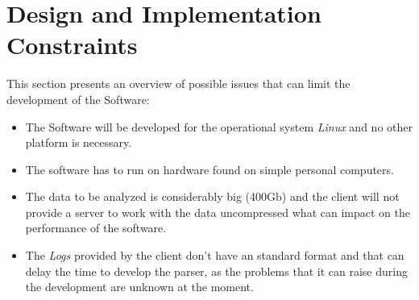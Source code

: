 \documentclass{scrreprt}
\begin{document}
\section{Design and Implementation Constraints}
This section presents an overview of possible issues that can limit the
development of the Software:
\begin{itemize}
\item The Software will be developed for the operational system \textit{Linux} and no
other platform is necessary.
\item The software has to run on hardware found on simple personal computers.
\item The data to be analyzed is considerably big (400Gb) and the client will not provide a
server to work with the data uncompressed what can impact on the performance of
the software.
\item The \textit{Logs} provided by the client don't have an standard format and that
can delay the time to develop the parser, as the problems that it can raise
during the development are unknown at the moment.
\end{itemize}
\end{document}
